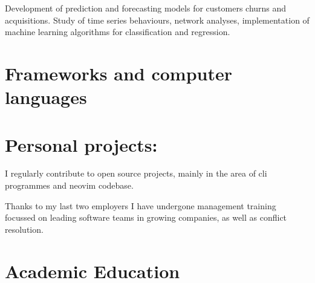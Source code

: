\documentclass[11pt,a4paper,sans]{moderncv}
\begin{document}
 {%
	Development of prediction and forecasting models for customers churns and acquisitions. Study of time series behaviours, network analyses, implementation of machine learning algorithms for classification and regression.}



\newpage
\section{Frameworks and computer languages}

\section{Personal projects:}


\medskip
I regularly contribute to open source projects, mainly in the area of cli
programmes and neovim codebase.

\medskip
Thanks to my last two employers I have undergone management training
focussed on leading software teams in growing companies, as well as conflict
resolution.


\section{Academic Education}
\end{document}
